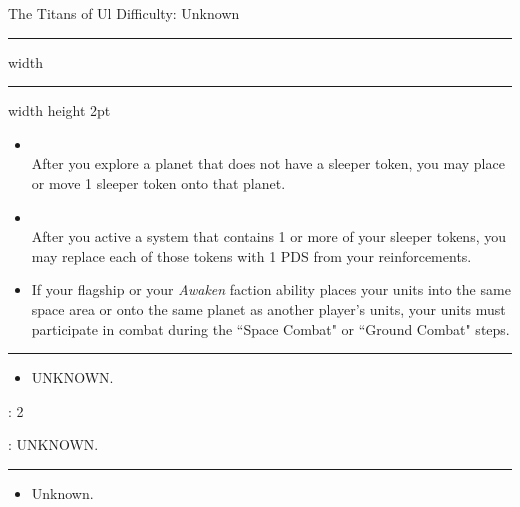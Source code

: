 {\handel\Huge The Titans of Ul} \hfill {\Large Difficulty: Unknown} \vspace{-4pt}\\
\hrule width \hsize \kern 1mm \hrule width \hsize height 2pt


\begin{multicols}{2}


\begin{itemize}
\item {}\\
After you explore a planet that does not have a sleeper token, you may place or move 1 sleeper token onto that planet.
\item {}\\
After you active a system that contains 1 or more of your sleeper tokens, you may replace each of those tokens with 1 PDS from your reinforcements.
\item {} If your flagship or your \emph{Awaken} faction ability places your units into the same space area or onto the same planet as another player’s units, your units must participate in combat during the ``Space Combat" or ``Ground Combat" steps. 
\end{itemize}


\vspace{-10pt}\rule{\hsize}{0.4pt}\vspace{5pt}


\vspace{-5pt}
\begin{multicols}{2}
\begin{itemize}
\item UNKNOWN. %
\end{itemize}
\end{multicols}

\vspace{-5pt}
: 2

\vspace{2pt}
: UNKNOWN. %

\rule{\hsize}{0.4pt}\vspace{5pt}


\begin{itemize}
\item Unknown.
\end{itemize}


\end{multicols}
